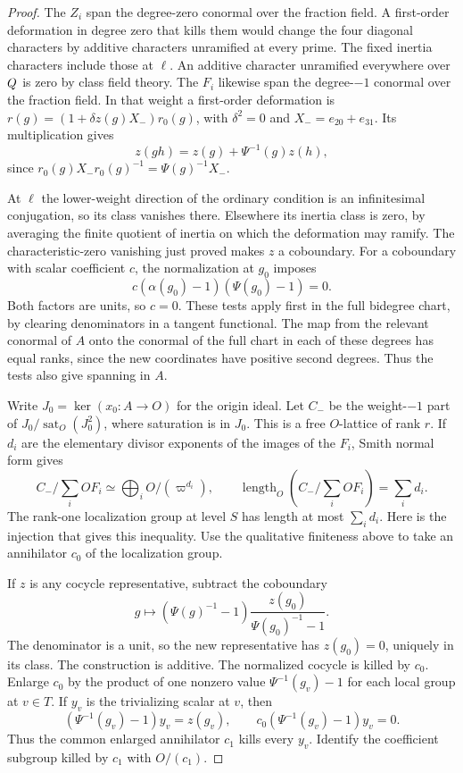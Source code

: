 \begin{proof}

The \(Z_i\) span the degree-zero conormal over the fraction
field. A first-order deformation in degree zero that kills
them would change the four diagonal characters by additive
characters unramified at every prime. The fixed inertia
characters include those at \(\ell\). An additive character
unramified everywhere over \(Q\) is zero by class field theory.
The \(F_i\) likewise span the degree-\(-1\) conormal over the
fraction field. In that weight a first-order deformation is
\(r(g)=(1+\delta z(g)X_-)r_0(g)\), with \(\delta^2=0\) and
\(X_-=e_{20}+e_{31}\). Its multiplication gives
\[
       z(gh)=z(g)+\Psi^{-1}(g)z(h),
\]
since \(r_0(g)X_-r_0(g)^{-1}=\Psi(g)^{-1}X_-\).

At \(\ell\) the lower-weight direction
of the ordinary condition is an infinitesimal conjugation,
so its class vanishes there. Elsewhere its inertia class is
zero, by averaging the finite quotient of inertia on which
the deformation may ramify. The characteristic-zero vanishing
just proved makes \(z\) a
coboundary. For a coboundary with scalar coefficient \(c\), the
normalization at \(g_0\) imposes
\[
    c(\alpha(g_0)-1)(\Psi(g_0)-1)=0 .
\]
Both factors are units, so \(c=0\). These tests apply first in the
full bidegree chart, by clearing denominators in a tangent
functional. The map from the relevant conormal of \(A\) onto
the conormal of the full chart in each of these degrees has
equal ranks, since the new coordinates have positive second
degrees. Thus the tests also give spanning in \(A\).
\label{cor:ordinary-symplectic-cohomology-7}

Write \(J_0=\ker(x_0:A\to O)\) for the origin ideal.
Let \(C_-\) be the weight-\(-1\) part of
\(J_0/\operatorname{sat}_O(J_0^2)\), where saturation
is in \(J_0\). This is a free \(O\)-lattice of rank \(r\).
If \(d_i\) are the elementary divisor exponents of the images of the \(F_i\), Smith normal form gives
\[
 C_-/\sum_i OF_i\simeq\bigoplus_i O/(\varpi^{d_i}),\qquad
 \operatorname{length}_O(C_-/\sum_i OF_i)=\sum_i d_i .
\] The rank-one localization group
at level \(S\) has length at most \(\sum_i d_i\).
Here is the injection that gives this inequality.
Use the qualitative finiteness above to take an annihilator
\(c_0\) of the localization group.

If \(z\) is any cocycle representative, subtract the
coboundary
\[
 g\longmapsto(\Psi(g)^{-1}-1)
                         \frac{z(g_0)}{\Psi(g_0)^{-1}-1}.
\]
The denominator is a unit, so the new representative
has \(z(g_0)=0\), uniquely in its class. The construction is
additive. The
normalized cocycle is killed by \(c_0\).
Enlarge \(c_0\) by the product of one nonzero value
\(\Psi^{-1}(g_v)-1\) for each local group at \(v\in T\).
If \(y_v\) is the trivializing scalar at \(v\), then
\[
   (\Psi^{-1}(g_v)-1)y_v=z(g_v),\qquad
   c_0(\Psi^{-1}(g_v)-1)y_v=0 .
\]
Thus the common enlarged annihilator \(c_1\) kills every \(y_v\).
Identify the coefficient subgroup killed by \(c_1\) with
\(O/(c_1)\).


\end{proof}
